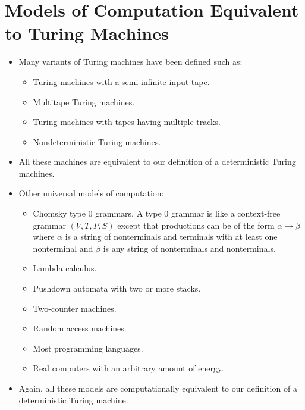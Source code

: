\documentclass[]{article}
\begin{document}
\section{Models of Computation Equivalent to Turing Machines}
  \begin{itemize}
    \item Many variants of Turing machines have been defined such as:
      \begin{itemize}
        \item Turing machines with a semi-infinite input tape.
        \item Multitape Turing machines.
        \item Turing machines with tapes having multiple tracks.
        \item Nondeterministic Turing machines.
      \end{itemize}
    \item All these machines are equivalent to our definition of a 
    deterministic Turing machines.
    \item Other universal models of computation:
      \begin{itemize}
        \item Chomsky type 0 grammars. A type 0 grammar is like a context-free 
        grammar $(V, T, P, S)$ except that productions can be of the form
        $\alpha \rightarrow \beta$ where $\alpha$ is a string of nonterminals 
        and terminals with at least one nonterminal and $\beta$ is any string 
        of nonterminals and nonterminals.
        \item Lambda calculus.
        \item Pushdown automata with two or more stacks.
        \item Two-counter machines.
        \item Random access machines.
        \item Most programming languages.
        \item Real computers with an arbitrary amount of energy.
      \end{itemize}
    \item Again, all these models are computationally equivalent to our 
    definition of a deterministic Turing machine.
  \end{itemize}
\end{document}
